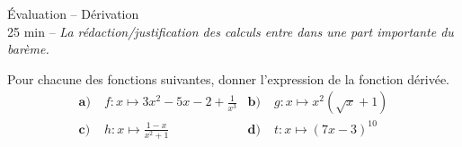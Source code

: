 \documentclass[11pt]{article}
\begin{document}
\begin{center}
  {\Huge Évaluation -- Dérivation}\\
  25 min -- \emph{La rédaction/justification des calculs entre dans une part
  importante du barème.}
\end{center}

\noindent Pour chacune des fonctions suivantes, donner l'expression de la fonction
dérivée.
\begin{align*}
  \textbf{a)}\; & f:x\mapsto 3x^2-5x-2+\frac{1}{x^3} &
  \textbf{b)}\; & g:x\mapsto x^2(\sqrt x+1) \\
  \textbf{c)}\; & h:x\mapsto \frac{1-x}{x^2+1} &
  \textbf{d)}\; & t:x\mapsto (7x-3)^{10}
\end{align*}
\vspace{2cm}
\end{document}
